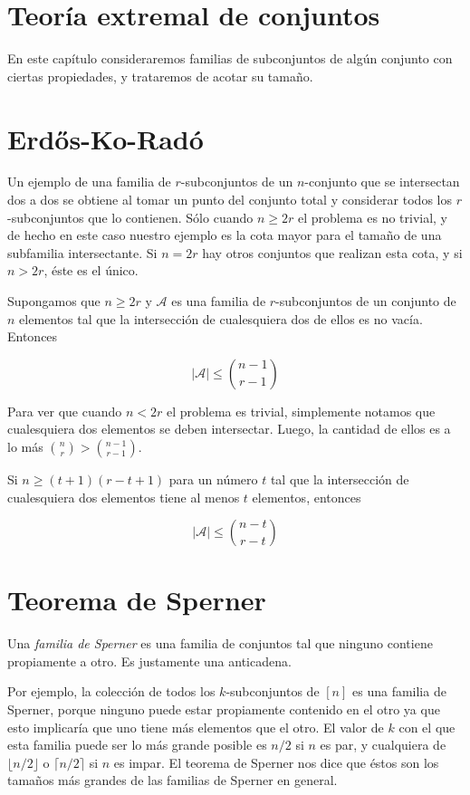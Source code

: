\section{Teoría extremal de conjuntos}
\label{%
section-teoria-extremal-de-conjuntos}
En este capítulo consideraremos familias de
subconjuntos de algún conjunto con ciertas
propiedades, y trataremos de acotar su
tamaño.

\section{Erdős-Ko-Radó}
\label{section-erdos-ko-rado}
Un ejemplo de una familia de $r$-subconjuntos
de un $n$-conjunto que se intersectan dos a
dos se obtiene al tomar un punto del conjunto
total y considerar todos los $r$-subconjuntos
que lo contienen. Sólo cuando $n\geq2r$ el
problema es no trivial, y de hecho en este
caso nuestro ejemplo es la cota mayor para el
tamaño de una subfamilia intersectante. Si $n
= 2r$ hay otros conjuntos que realizan esta
cota, y si $n>2r$, éste es el único.
\begin{theorem}
\label{theorem-combi-015}
Supongamos que $n\geq 2r$ y $\mathcal{A}$ es
una familia de $r$-subconjuntos de un
conjunto de $n$ elementos tal que la
intersección de cualesquiera dos de ellos es
no vacía. Entonces

$$
|\mathcal{A}|\leq{n-1\choose r-1}
$$

\end{theorem}
Para ver que cuando $n<2r$ el problema es
trivial, simplemente notamos que cualesquiera
dos elementos se deben intersectar. Luego, la
cantidad de ellos es a lo más ${n \choose
r}>{n-1 \choose r-1}$.
\begin{theorem}
\label{theorem-combi-016}
Si $n\geq(t + 1)(r-t + 1)$ para un número $t$
tal que la intersección de cualesquiera dos
elementos tiene al menos $t$ elementos,
entonces

$$
|\mathcal{A}|\leq{n-t\choose r-t}
$$

\end{theorem}
\section{Teorema de Sperner}
\label{section-teorema-de-sperner}
\begin{definition}
\label{definition-combi-020}
Una \emph{familia de Sperner} es una familia
de conjuntos tal que ninguno contiene
propiamente a otro. Es justamente una
anticadena.
\end{definition}
Por ejemplo, la colección de todos los
$k$-subconjuntos de $[n]$ es una familia de
Sperner, porque ninguno puede estar
propiamente contenido en el otro ya que esto
implicaría que uno tiene más elementos que el
otro. El valor de $k$ con el que esta familia
puede ser lo más grande posible es $n/2$ si
$n$ es par, y cualquiera de $\lfloor
n/2\rfloor$ o $\lceil n/2\rceil$ si $n$ es
impar. El teorema de Sperner nos dice que
éstos son los tamaños más grandes de las
familias de Sperner en general.

